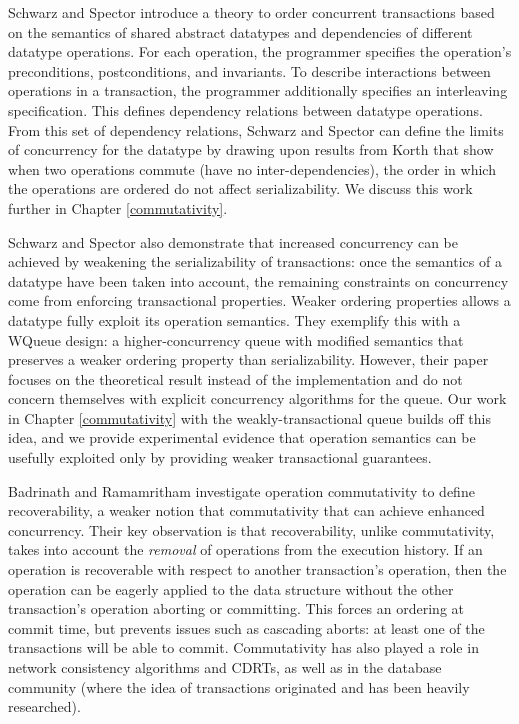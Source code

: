 Schwarz and Spector\cite{schwarz} introduce a theory to order concurrent transactions based on the semantics of shared abstract datatypes and dependencies of different datatype operations. For each operation, the programmer specifies the operation's preconditions, postconditions, and invariants. To describe interactions between operations in a transaction, the programmer additionally specifies an interleaving specification. This defines dependency relations between datatype operations. From this set of dependency relations, Schwarz and Spector can define the limits of concurrency for the datatype by drawing upon results from Korth\cite{korth} that show when two operations commute (have no inter-dependencies), the order in which the operations are ordered do not affect serializability. We discuss this work further in Chapter \ref{commutativity}. 

Schwarz and Spector also demonstrate that increased concurrency can be achieved by weakening the serializability of transactions: once the semantics of a datatype have been taken into account, the remaining constraints on concurrency come from enforcing transactional properties\cite{kung}. Weaker ordering properties allows a datatype fully exploit its operation semantics. They exemplify this with a WQueue design: a higher-concurrency queue with modified semantics that preserves a weaker ordering property than serializability. However, their paper focuses on the theoretical result instead of the implementation and do not concern themselves with explicit concurrency algorithms for the queue. Our work in Chapter \ref{commutativity} with the weakly-transactional queue builds off this idea, and we provide experimental evidence that operation semantics can be usefully exploited only by providing weaker transactional guarantees.

Badrinath and Ramamritham\cite{badrinath} investigate operation commutativity to define recoverability, a weaker notion that commutativity that can achieve enhanced concurrency. Their key observation is that recoverability, unlike commutativity, takes into account the \emph{removal} of operations from the execution history. If an operation is recoverable with respect to another transaction's operation, then the operation can be eagerly applied to the data structure without the other transaction's operation aborting or committing. This forces an ordering at commit time, but prevents issues such as cascading aborts: at least one of the transactions will be able to commit. Commutativity has also played a role in network consistency algorithms and CDRTs\cite{CRDT}, as well as in the database community (where the idea of transactions originated and has been heavily researched).

